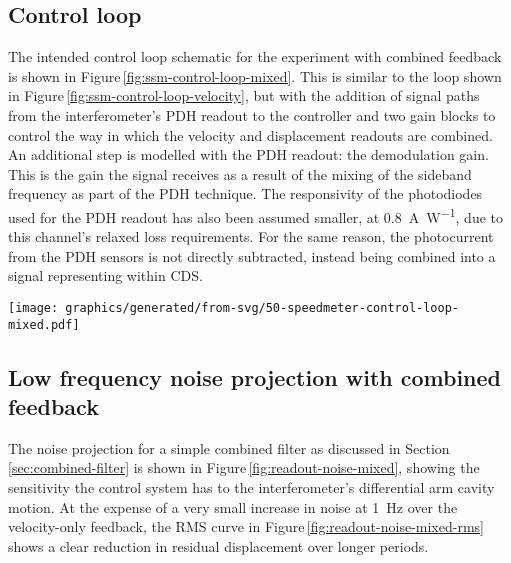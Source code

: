 \subsection{Control loop}
The intended control loop schematic for the experiment with combined feedback is shown in Figure\,\ref{fig:ssm-control-loop-mixed}. This is similar to the loop shown in Figure\,\ref{fig:ssm-control-loop-velocity}, but with the addition of signal paths from the interferometer's \gls{PDH} readout to the controller and two gain blocks to control the way in which the velocity and displacement readouts are combined. An additional step is modelled with the \gls{PDH} readout: the demodulation gain. This is the gain the signal receives as a result of the mixing of the sideband frequency as part of the \gls{PDH} technique. The responsivity of the photodiodes used for the \gls{PDH} readout has also been assumed smaller, at \SI{0.8}{\ampere\per\watt}, due to this channel's relaxed loss requirements. For the same reason, the photocurrent from the \gls{PDH} sensors is not directly subtracted, instead being combined into a signal representing \LMINUS{} within \gls{CDS}.

\begin{sidewaysfigure}
  \texttt{[image: graphics/generated/from-svg/50-speedmeter-control-loop-mixed.pdf]}
  \caption[Modelled \SSMEXPT{} control loop using both displacement and velocity feedback]{\label{fig:ssm-control-loop-mixed}\SSMEXPT{} control loop model. This control loop is similar to that shown in Figure\,\ref{fig:ssm-control-loop-velocity}, but with the addition of components used to send the displacement-sensitive \gls{PDH} readout to \gls{CDS}. Within \gls{CDS}, additional gain blocks allow for control over the way in which the velocity and displacement readouts are combined into one feedback signal.}
\end{sidewaysfigure}

\subsection{Low frequency noise projection with combined feedback}
The \LMINUS{} noise projection for a simple combined filter as discussed in Section\,\ref{sec:combined-filter} is shown in Figure\,\ref{fig:readout-noise-mixed}, showing the sensitivity the control system has to the interferometer's differential arm cavity motion. At the expense of a very small increase in noise at \SI{1}{\hertz} over the velocity-only feedback, the \gls{RMS} curve in Figure\,\ref{fig:readout-noise-mixed-rms} shows a clear reduction in residual displacement over longer periods.

